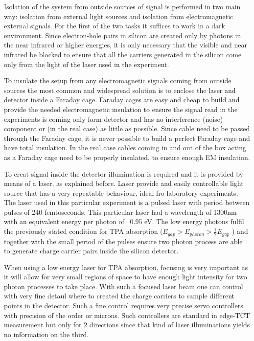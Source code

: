 Isolation of the system from outside sources of signal is performed in two main way: isolation from external light sources and isolation from electromagnetic external signals. For the first of the two tasks it suffices to work in a dark environment. Since electron-hole pairs in silicon are created only by photons in the near infrared or higher energies, it is only necessary that the visible and near infrared be blocked to ensure that all the carriers generated in the silicon come only from the light of the laser used in the experiment.

To insulate the setup from any electromagnetic signals coming from outside sources the most common and widespread solution is to enclose the laser and detector inside a Faraday cage. Faraday cages are easy and cheap to build and provide the needed electromagnetic insulation to ensure the signal read in the experiments is coming only form detector and has no interference (noise) component or (in the real case) as little as possible. Since cable need to be passed through the Faraday cage, it is never possible to build a perfect Faraday cage and have total insulation. In the real case cables coming in and out of the box acting as a Faraday cage need to be properly insulated, to ensure enough EM insulation.

To creat signal inside the detector illumination is required and it is provided by means of a laser, as explained before. Laser provide and easily controllable light source that has a very repeatable behaviour, ideal fro laboratory experiments. The laser used in this particular experiment is a pulsed laser with period between pulses of 240 femtoseconds. This particular laser had a wavelength of 1300nm with an equivalent energy per photon of ~0.95 eV. The low energy photons fulfil the previously stated condition for TPA absorption ($E_{gap} > E_{photon} > \frac{1}{2} E_{gap}$ ) and together with the small period of the pulses ensure two photon process are able to generate charge carrier pairs inside the silicon detector.

When using a low energy laser for TPA absorption, focusing is very important as it will allow for very small regions of space to have enough light intensity for two photon processes to take place. With such a focused laser beam one can control with very fine detaul where to created the charge carriers to sample different points in the detector. Such a fine control requires very precise servo controllers with precision of the order or microns. Such controllers are standard in edge-TCT measurement but only for 2 directions since that kind of laser illuminations yields no information on the third.


